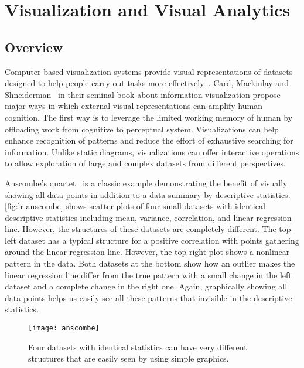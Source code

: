 \section{Visualization and Visual Analytics}

\subsection{Overview}
Computer-based visualization systems provide visual representations of datasets designed to help people carry out tasks more effectively~\cite{Munzner2014}. Card, Mackinlay and Shneiderman~\cite{Card1999} in their seminal book about information visualization propose major ways in which external visual representations can amplify human cognition. The first way is to  leverage the limited working memory of human by offloading work from cognitive to perceptual system. Visualizations can help enhance recognition of patterns and reduce the effort of exhaustive searching for information. Unlike static diagrams, visualizations can offer interactive operations to allow exploration of large and complex datasets from different perspectives.

Anscombe's quartet~\cite{Anscombe1973} is a classic example demonstrating the benefit of visually showing all data points in addition to a data summary by descriptive statistics. \autoref{fig:lr-anscombe} shows scatter plots of four small datasets with  identical descriptive statistics including mean, variance, correlation, and linear regression line. However, the structures of these datasets are completely different. The top-left dataset has a typical structure for a positive correlation with points gathering around the linear regression line. However, the top-right plot shows a nonlinear pattern in the data. Both datasets at the bottom show how an outlier makes the linear regression line differ from the true pattern with a small change in the left dataset and a complete change in the right one. Again, graphically showing all data points helps us easily see all these patterns that invisible in the descriptive statistics.

\begin{figure}[!htb]
	\centering
	\texttt{[image: anscombe]}
	\caption{Four datasets with identical statistics can have
very different structures that are easily seen by using simple graphics. }
	\label{fig:lr-anscombe}
\end{figure}


